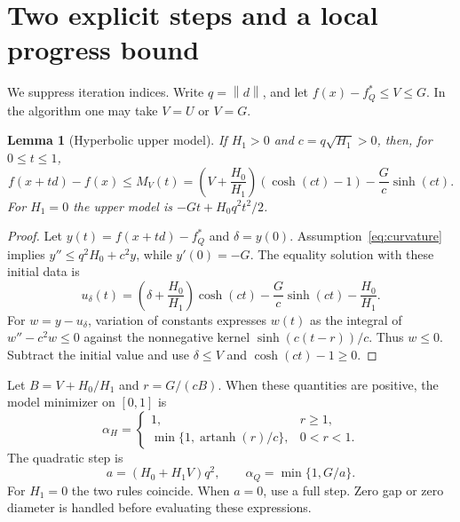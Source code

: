 \documentclass[11pt]{article}
\newtheorem{lemma}[theorem]{Lemma}
\newcommand{\norm}[1]{\left\|#1\right\|}
\DeclareMathOperator{\artanh}{artanh}
\begin{document}
\section{Two explicit steps and a local progress bound}
We suppress iteration indices. Write $q=\norm d$, and let
$f(x)-f_Q^*\le V\le G$. In the algorithm one may take $V=U$ or $V=G$.

\begin{lemma}[Hyperbolic upper model]\label{lem:model}
If $H_1>0$ and $c=q\sqrt{H_1}>0$, then, for $0\le t\le1$,
\begin{equation}\label{eq:model}
 f(x+td)-f(x)\le M_V(t)
 =\left(V+\frac{H_0}{H_1}\right)(\cosh(ct)-1)
 -\frac Gc\sinh(ct).
\end{equation}
For $H_1=0$ the upper model is $-Gt+H_0q^2t^2/2$.
\end{lemma}
\begin{proof}
Let $y(t)=f(x+td)-f_Q^*$ and $\delta=y(0)$. Assumption~\eqref{eq:curvature}
implies $y''\le q^2H_0+c^2y$, while $y'(0)=-G$.
The equality solution with these initial data is
\[
 u_\delta(t)=\left(\delta+\frac{H_0}{H_1}\right)\cosh(ct)
              -\frac Gc\sinh(ct)-\frac{H_0}{H_1}.
\]
For $w=y-u_\delta$, variation of constants expresses $w(t)$ as the
integral of $w''-c^2w\le0$ against the nonnegative kernel
$\sinh(c(t-r))/c$. Thus $w\le0$. Subtract the initial value and use
$\delta\le V$ and $\cosh(ct)-1\ge0$.
\end{proof}

Let $B=V+H_0/H_1$ and $r=G/(cB)$. When these quantities are positive,
the model minimizer on $[0,1]$ is
\begin{equation}\label{eq:hyperbolic}
 \alpha_H=\begin{cases}
 1,&r\ge1,\\
 \min\{1,\artanh(r)/c\},&0<r<1.
 \end{cases}
\end{equation}
The quadratic step is
\begin{equation}\label{eq:quadratic}
 a=(H_0+H_1V)q^2,\qquad \alpha_Q=\min\{1,G/a\}.
\end{equation}
For $H_1=0$ the two rules coincide. When $a=0$, use a full step.
Zero gap or zero diameter is handled before evaluating these expressions.
\end{document}
